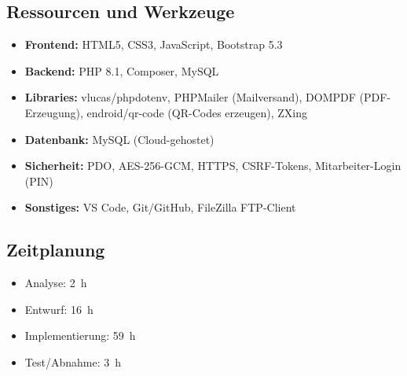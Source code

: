 \subsection{Ressourcen und Werkzeuge}
\begin{itemize}
  \item \textbf{Frontend:} \ac{HTML}5, \ac{CSS}3, JavaScript, Bootstrap 5.3
  \item \textbf{Backend:} \ac{PHP} 8.1, Composer, MySQL
  \item \textbf{Libraries:} vlucas/phpdotenv, \ac{PHP}Mailer (Mailversand), \ac{DOM}\ac{PDF} (PDF-Erzeugung), endroid/qr-code (QR-Codes erzeugen), \ac{ZXing}
  \item \textbf{Datenbank:} My\ac{SQL} (\ac{Cloud}-gehostet)
  \item \textbf{Sicherheit:} PDO, \ac{AES}-256-GCM, HTTPS, \ac{CSRF}-Tokens, Mitarbeiter-Login (PIN)
  \item \textbf{Sonstiges:} \ac{VS Code}, \ac{Git}/\ac{GitHub}, FileZilla \ac{FTP}-Client
\end{itemize}

\subsection{Zeitplanung}
\begin{itemize}
  \item Analyse: 2~h
  \item Entwurf: 16~h
  \item Implementierung: 59~h
  \item Test/Abnahme: 3~h
\end{itemize}
\newpage
